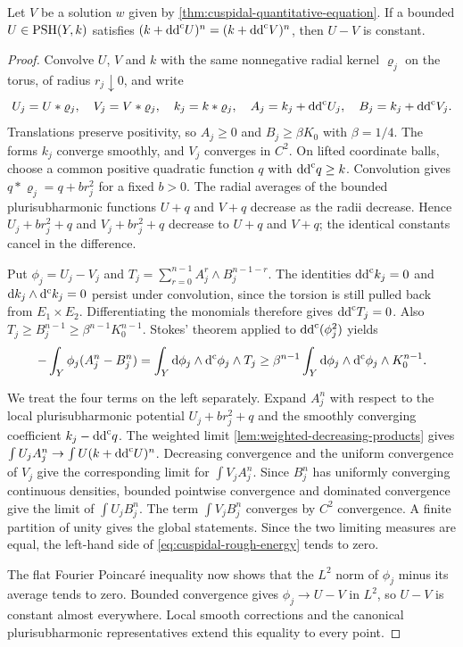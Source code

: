 \begin{proposition}\label{prop:cuspidal-bounded-uniqueness}
Let $V$ be a solution $w$ given by \cref{thm:cuspidal-quantitative-equation}. If a bounded $U\in\mathrm{PSH}(Y,k)$ satisfies $(k+\mathrm{dd}^{\mathrm{c}} U)^n=(k+\mathrm{dd}^{\mathrm{c}} V)^n$, then $U-V$ is constant.
\end{proposition}
\begin{proof}
Convolve $U$, $V$ and $k$ with the same nonnegative radial kernel $\varrho_j$ on the torus, of radius $r_j\downarrow0$, and write
\[
 U_j=U*\varrho_j,\quad V_j=V*\varrho_j,\quad k_j=k*\varrho_j,
 \quad A_j=k_j+\mathrm{dd}^{\mathrm{c}} U_j,\quad B_j=k_j+\mathrm{dd}^{\mathrm{c}} V_j.
\]
Translations preserve positivity, so $A_j\geq0$ and $B_j\geq\beta K_0$ with $\beta=1/4$. The forms $k_j$ converge smoothly, and $V_j$ converges in $C^2$. On lifted coordinate balls, choose a common positive quadratic function $q$ with $\mathrm{dd}^{\mathrm{c}} q\geq k$. Convolution gives $q*\varrho_j=q+b r_j^2$ for a fixed $b>0$. The radial averages of the bounded plurisubharmonic functions $U+q$ and $V+q$ decrease as the radii decrease. Hence $U_j+b r_j^2+q$ and $V_j+b r_j^2+q$ decrease to $U+q$ and $V+q$; the identical constants cancel in the difference.

Put $\phi_j=U_j-V_j$ and $T_j=\sum_{r=0}^{n-1}A_j^r\wedge B_j^{n-1-r}$. The identities $\mathrm{dd}^{\mathrm{c}} k_j=0$ and $\mathrm dk_j\wedge\mathrm d^{\mathrm c} k_j=0$ persist under convolution, since the torsion is still pulled back from $E_1\times E_2$. Differentiating the monomials therefore gives $\mathrm{dd}^{\mathrm{c}} T_j=0$. Also $T_j\geq B_j^{n-1}\geq\beta^{n-1}K_0^{n-1}$. Stokes' theorem applied to $\mathrm{dd}^{\mathrm{c}}(\phi_j^2)$ yields
\begin{equation}\label{eq:cuspidal-rough-energy}
 -\int_Y\phi_j(A_j^n-B_j^n)
 =\int_Y\mathrm d\phi_j\wedge\mathrm d^{\mathrm c}\phi_j\wedge T_j
 \geq\beta^{n-1}\int_Y\mathrm d\phi_j\wedge\mathrm d^{\mathrm c}\phi_j\wedge K_0^{n-1}.
\end{equation}

We treat the four terms on the left separately. Expand $A_j^n$ with respect to the local plurisubharmonic potential $U_j+b r_j^2+q$ and the smoothly converging coefficient $k_j-\mathrm{dd}^{\mathrm{c}} q$. The weighted limit \cref{lem:weighted-decreasing-products} gives $\int U_jA_j^n\to\int U(k+\mathrm{dd}^{\mathrm{c}} U)^n$. Decreasing convergence and the uniform convergence of $V_j$ give the corresponding limit for $\int V_jA_j^n$. Since $B_j^n$ has uniformly converging continuous densities, bounded pointwise convergence and dominated convergence give the limit of $\int U_jB_j^n$. The term $\int V_jB_j^n$ converges by $C^2$ convergence. A finite partition of unity gives the global statements. Since the two limiting measures are equal, the left-hand side of \eqref{eq:cuspidal-rough-energy} tends to zero.

The flat Fourier Poincar\'e inequality now shows that the $L^2$ norm of $\phi_j$ minus its average tends to zero. Bounded convergence gives $\phi_j\to U-V$ in $L^2$, so $U-V$ is constant almost everywhere. Local smooth corrections and the canonical plurisubharmonic representatives extend this equality to every point.
\end{proof}

